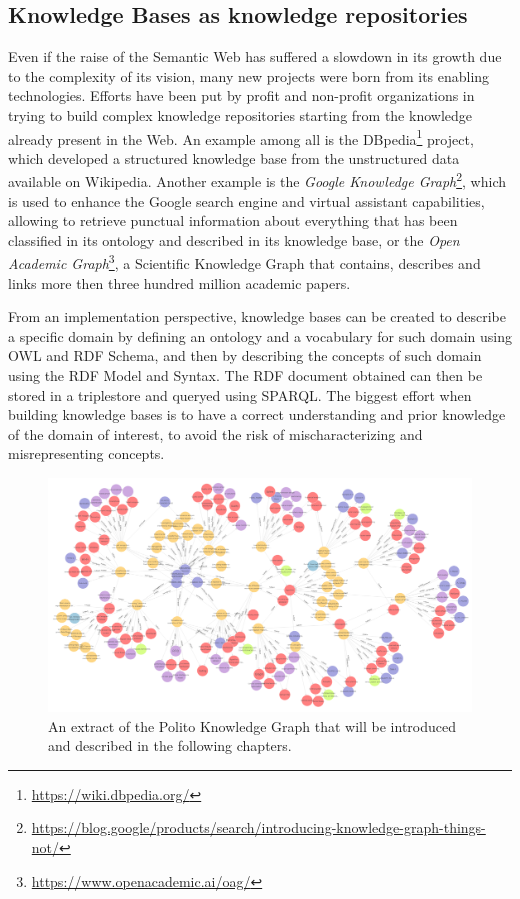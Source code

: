 \documentclass[%
    corpo=13.5pt,
    twoside,
    oldstyle,
    tipotesi=magistrale,
    greek,
    evenboxes
]{toptesi}
\begin{document}
\subsection{Knowledge Bases as knowledge repositories}

Even if the raise of the Semantic Web has suffered a slowdown in its growth
due to the complexity of its vision, many new projects were born from its
enabling technologies. Efforts have been put by profit and
non-profit organizations in trying to build complex knowledge repositories
starting from the knowledge already present in the Web. An example among all
is the DBpedia\footnote{\url{https://wiki.dbpedia.org/}} project, which
developed a structured knowledge base from the unstructured data available on
Wikipedia.
Another example is the
\emph{Google Knowledge Graph}\footnote{\url{https://blog.google/products/search/introducing-knowledge-graph-things-not/}},
which is used to enhance the Google search engine and virtual assistant
capabilities, allowing to retrieve punctual information about everything that
has been classified in its ontology and described in its knowledge base, or
the \emph{Open Academic Graph}\footnote{\url{https://www.openacademic.ai/oag/}},
a Scientific Knowledge Graph that contains, describes and links more then
three hundred million academic papers.

From an implementation perspective, knowledge bases can be created to
describe a specific domain by defining an ontology and a vocabulary for
such domain using OWL and RDF Schema, and then by describing the concepts
of such domain using the RDF Model and Syntax. The RDF document obtained
can then be stored in a triplestore and queryed using SPARQL. The biggest effort
when building knowledge bases is to have a correct understanding and prior
knowledge of the domain of interest, to avoid the risk of mischaracterizing
and misrepresenting concepts.

\begin{figure}[h]
    \centering
    \includegraphics[scale=0.4]{img/geranium-knowledge-base-example.png}
    \caption{An extract of the Polito Knowledge Graph that will be introduced and
    described in the following chapters.}
    \label{fig:geranium-knowledge-base-example}
\end{figure}
\end{document}
